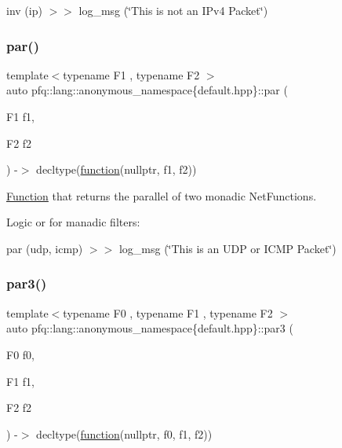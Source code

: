 inv (ip) $>$$>$ log\+\_\+msg (\char`\"{}\+This is not an I\+Pv4 Packet\char`\"{}) \mbox{\label{namespacepfq_1_1lang_1_1anonymous__namespace_02default_8hpp_03_a34805fabe99c4a438ed0a3658e1697a5}} 
\subsubsection{\texorpdfstring{par()}{par()}}
{\footnotesize\ttfamily template$<$typename F1 , typename F2 $>$ \\
auto pfq\+::lang\+::anonymous\+\_\+namespace\{default.\+hpp\}\+::par (\begin{DoxyParamCaption}\item[{F1}]{f1,  }\item[{F2}]{f2 }\end{DoxyParamCaption}) -\/$>$ decltype(\hyperlink{namespacepfq_1_1lang_a1a4638059d700ae08d0ca63886ff2bb3}{function}(nullptr, f1, f2))
        }



\hyperlink{structpfq_1_1lang_1_1Function}{Function} that returns the parallel of two monadic Net\+Functions. 

Logic \textquotesingle{}or\textquotesingle{} for manadic filters\+:

par (udp, icmp) $>$$>$ log\+\_\+msg (\char`\"{}\+This is an U\+D\+P or I\+C\+M\+P Packet\char`\"{}) \mbox{\label{namespacepfq_1_1lang_1_1anonymous__namespace_02default_8hpp_03_ab27a95d906297e5ec97c2d77d2144a80}} 
\subsubsection{\texorpdfstring{par3()}{par3()}}
{\footnotesize\ttfamily template$<$typename F0 , typename F1 , typename F2 $>$ \\
auto pfq\+::lang\+::anonymous\+\_\+namespace\{default.\+hpp\}\+::par3 (\begin{DoxyParamCaption}\item[{F0}]{f0,  }\item[{F1}]{f1,  }\item[{F2}]{f2 }\end{DoxyParamCaption}) -\/$>$ decltype(\hyperlink{namespacepfq_1_1lang_a1a4638059d700ae08d0ca63886ff2bb3}{function}(nullptr, f0, f1, f2))
        }



